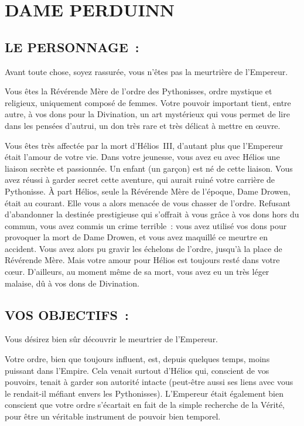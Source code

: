 \documentclass[14pt,twocolumn]{extarticle}
\begin{document}
\section{DAME PERDUINN}

\subsection{LE PERSONNAGE~:}

Avant toute chose, soyez rassurée, vous n'êtes pas la meurtrière de l'Empereur.

Vous êtes la Révérende Mère de l'ordre des Pythonisses, ordre mystique et
religieux, uniquement composé de femmes. Votre pouvoir important tient, entre
autre, à vos dons pour la Divination, un art mystérieux qui vous permet de lire
dans les pensées d'autrui, un don très rare et très délicat à mettre en œuvre.

Vous êtes très affectée par la mort d'Hélios~III, d'autant plus que l'Empereur
était l'amour de votre vie. Dans votre jeunesse, vous avez eu avec Hélios une
liaison secrète et passionnée. Un enfant (un garçon) est né de cette liaison.
Vous avez réussi à garder secret cette aventure, qui aurait ruiné votre
carrière de Pythonisse. À part Hélios, seule la Révérende Mère de l'époque,
Dame Drowen, était au courant. Elle vous a alors menacée de vous chasser de
l'ordre. Refusant d'abandonner la destinée prestigieuse qui s'offrait à vous
grâce à vos dons hors du commun, vous avez commis un crime terrible~: vous avez
utilisé vos dons pour provoquer la mort de Dame Drowen, et vous avez maquillé
ce meurtre en accident. Vous avez alors pu gravir les échelons de l'ordre,
jusqu'à la place de Révérende Mère. Mais votre amour pour Hélios est toujours
resté dans votre c\oe{}ur. D'ailleurs, au moment même de sa mort, vous avez eu
un très léger malaise, dû à vos dons de Divination.

\subsection{VOS OBJECTIFS~:}

Vous désirez bien sûr découvrir le meurtrier de l'Empereur.

Votre ordre, bien que toujours influent, est, depuis quelques temps, moins
puissant dans l'Empire. Cela venait surtout d'Hélios qui, conscient de vos
pouvoirs, tenait à garder son autorité intacte (peut-être aussi ses liens avec
vous le rendait-il méfiant envers les Pythonisses). L'Empereur était également
bien conscient que votre ordre s'écartait en fait de la simple recherche de la
Vérité, pour être un véritable instrument de pouvoir bien temporel.
\end{document}

